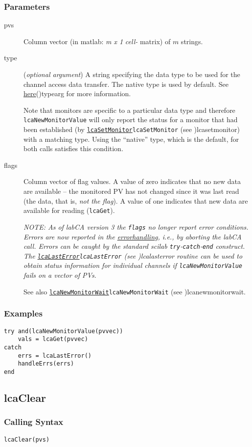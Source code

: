 \documentclass{article}
\newcommand{\sca}{\ita{labCA}}
\newcommand{\scilab}{\ita{scilab}}
\newcommand{\com}[1]{{\tt #1}}
\newcommand{\pbrk}{\pagebreak[3]}
\newcommand{\comref}[2]{\hyperref[ref]{\com{#1}}{\com{#1} (see }{)}{#2}}
\newcommand{\ita}[1]{\emph{#1}}
\newcommand{\m}{$m$}
\newcommand{\mhack}{$m$} %
\newcommand{\mxl}{$m\times 1$}
\renewcommand{\m}{\ita{m}}
\newcommand{\mhack}{\ita{m}} %
\renewcommand{\mxl}{\ita{m x 1}}
\renewcommand{\pbrk}{}
\newcommand{\PVITEM}{
\item[pvs] Column vector (in matlab: \mxl{} \ita{cell-} matrix)
of \mhack{} strings.
}
\begin{document}
\subsubsection{Parameters}
\begin{description}
\PVITEM
\item[type]
(\ita{optional argument}) A string specifying the
data type to be used for the channel access data transfer. The
native type is used by default.
See \hyperref[ref]{here}{(}{)}{typearg} for more information.

Note that monitors are specific to a particular data type and therefore
\com{lcaNewMonitorValue} will only report the status for a monitor that had been established
(by \comref{lcaSetMonitor}{lcasetmonitor}) with a matching type.
Using the ``native'' type, which is the default, for both calls
satisfies this condition.
\item[flags]
Column vector of flag values. A value of zero indicates that no new data are available --
the monitored PV has not changed since it was last read (the data, that is, {\em not the flag}).
A value of one indicates that new data are available for reading (\com{lcaGet}).

{\em NOTE: As of \sca{} version 3 the \com{flags} no longer report error conditions.
Errors are now reported in the 
\hyperref{standard way}{standard way (see~}{)}{errorhandling},
i.e., by aborting the \sca{} call.
Errors can be caught by the standard \scilab{} \com{try}-\com{catch}-\com{end}
construct. The \comref{lcaLastError}{lcalasterror} routine can be used to obtain
status information for individual channels if \com{lcaNewMonitorValue} fails on
a vector of PVs.}

See also \comref{lcaNewMonitorWait}{lcanewmonitorwait}.
\end{description}
\subsubsection{Examples}
\begin{verbatim}
try and(lcaNewMonitorValue(pvvec))
	vals = lcaGet(pvvec)
catch
    errs = lcaLastError()
	handleErrs(errs)
end
\end{verbatim}

\pbrk
\subsection{lcaClear}
\label{lcaclear}
\subsubsection{Calling Syntax}
\begin{verbatim}
lcaClear(pvs)
\end{verbatim}
\end{document}
